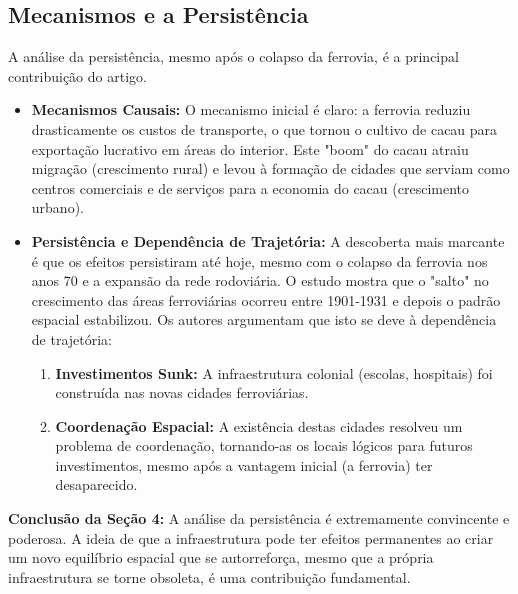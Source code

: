 \documentclass[12pt, a4paper]{article}
\begin{document}
\subsection{Mecanismos e a Persistência}
A análise da persistência, mesmo após o colapso da ferrovia, é a principal contribuição do artigo.
\begin{itemize}
    \item \textbf{Mecanismos Causais:} O mecanismo inicial é claro: a ferrovia reduziu drasticamente os custos de transporte, o que tornou o cultivo de cacau para exportação lucrativo em áreas do interior. Este "boom" do cacau atraiu migração (crescimento rural) e levou à formação de cidades que serviam como centros comerciais e de serviços para a economia do cacau (crescimento urbano).
    \item \textbf{Persistência e Dependência de Trajetória:} A descoberta mais marcante é que os efeitos persistiram até hoje, mesmo com o colapso da ferrovia nos anos 70 e a expansão da rede rodoviária. O estudo mostra que o "salto" no crescimento das áreas ferroviárias ocorreu entre 1901-1931 e depois o padrão espacial estabilizou. Os autores argumentam que isto se deve à dependência de trajetória:
        \begin{enumerate}
            \item \textbf{Investimentos Sunk:} A infraestrutura colonial (escolas, hospitais) foi construída nas novas cidades ferroviárias.
            \item \textbf{Coordenação Espacial:} A existência destas cidades resolveu um problema de coordenação, tornando-as os locais lógicos para futuros investimentos, mesmo após a vantagem inicial (a ferrovia) ter desaparecido.
        \end{enumerate}
\end{itemize}

\noindent\textbf{Conclusão da Seção 4:} A análise da persistência é extremamente convincente e poderosa. A ideia de que a infraestrutura pode ter efeitos permanentes ao criar um novo equilíbrio espacial que se autorreforça, mesmo que a própria infraestrutura se torne obsoleta, é uma contribuição fundamental.
\end{document}
